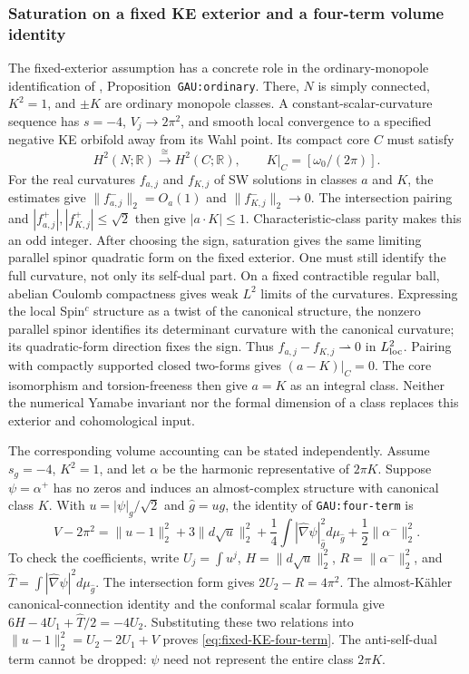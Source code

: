 \documentclass[a4paper,11pt]{article}
\numberwithin{equation}{section}
\theoremstyle{definition}
\begin{document}
\subsubsection{Saturation on a fixed KE exterior and a four-term volume identity}\label{sec:fixed-KE-tools}
The fixed-exterior assumption has a concrete role in the ordinary-monopole identification of , Proposition~\texttt{GAU:ordinary}. There, $N$ is simply connected, $K^2=1$, and $\pm K$ are ordinary monopole classes. A constant-scalar-curvature sequence has $s=-4$, $V_j\to2\pi^2$, and smooth local convergence to a specified negative KE orbifold away from its Wahl point. Its compact core $C$ must satisfy
\[
H^2(N;\mathbb R)\xrightarrow{\cong}H^2(C;\mathbb R),
\qquad K|_C=[\omega_0/(2\pi)].
\]
For the real curvatures $f_{a,j}$ and $f_{K,j}$ of SW solutions in classes $a$ and $K$, the estimates give $\|f_{a,j}^-\|_2=O_a(1)$ and $\|f_{K,j}^-\|_2\to0$. The intersection pairing and $|f_{a,j}^+|,|f_{K,j}^+|\le\sqrt2$ then give $|a\cdot K|\le1$. Characteristic-class parity makes this an odd integer. After choosing the sign, saturation gives the same limiting parallel spinor quadratic form on the fixed exterior.
One must still identify the full curvature, not only its self-dual part. On a fixed contractible regular ball, abelian Coulomb compactness gives weak $L^2$ limits of the curvatures. Expressing the local Spin$^c$ structure as a twist of the canonical structure, the nonzero parallel spinor identifies its determinant curvature with the canonical curvature; its quadratic-form direction fixes the sign. Thus $f_{a,j}-f_{K,j}\rightharpoonup0$ in $L^2_{\rm loc}$. Pairing with compactly supported closed two-forms gives $(a-K)|_C=0$. The core isomorphism and torsion-freeness then give $a=K$ as an integral class. Neither the numerical Yamabe invariant nor the formal dimension of a class replaces this exterior and cohomological input.

The corresponding volume accounting can be stated independently. Assume $s_g=-4$, $K^2=1$, and let $\alpha$ be the harmonic representative of $2\pi K$. Suppose $\psi=\alpha^+$ has no zeros and induces an almost-complex structure with canonical class $K$. With $u=|\psi|_g/\sqrt2$ and $\widehat g=ug$, the identity of \texttt{GAU:four-term} is
\begin{equation}\label{eq:fixed-KE-four-term}
V-2\pi^2=\|u-1\|_2^2+3\|d\sqrt u\|_2^2
+\frac14\int|\widehat\nabla\psi|_{\widehat g}^2d\mu_{\widehat g}
+\frac12\|\alpha^-\|_2^2.
\end{equation}
To check the coefficients, write $U_j=\int u^j$, $H=\|d\sqrt u\|_2^2$, $R=\|\alpha^-\|_2^2$, and $\widehat T=\int|\widehat\nabla\psi|^2d\mu_{\widehat g}$. The intersection form gives $2U_2-R=4\pi^2$. The almost-K\"ahler canonical-connection identity and the conformal scalar formula give
$6H-4U_1+\widehat T/2=-4U_2$.
Substituting these two relations into $\|u-1\|_2^2=U_2-2U_1+V$ proves \eqref{eq:fixed-KE-four-term}. The anti-self-dual term cannot be dropped: $\psi$ need not represent the entire class $2\pi K$.
\end{document}
